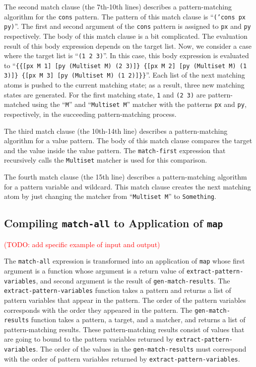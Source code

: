 \documentclass[acmlarge]{acmart}
\newcommand{\todo}[1]{\textcolor{red}{(TODO: #1)}}
\begin{document}
The second match clause (the 7th-10th lines) describes a pattern-matching algorithm for the \texttt{cons} pattern.
The pattern of this match clause is  ``\texttt{('cons px py)}''.
The first and second argument of the \texttt{cons} pattern is assigned to \texttt{px} and \texttt{py} respectively.
The body of this match clause is a bit complicated.
The evaluation result of this body expression depends on the target list.
Now, we consider a case where the target list is ``\texttt{(1 2 3)}''.
In this case, this body expression is evaluated to ``\texttt{\{\{[px M 1] [py (Multiset M) (2 3)]\} \{[px M 2] [py (Multiset M) (1 3)]\} \{[px M 3] [py (Multiset M) (1 2)]\}\}}''.
Each list of the next matching atoms is pushed to the current matching state; as a result, three new matching states are generated.
For the first matching state, \texttt{1} and \texttt{(2 3)} are pattern-matched using the ``\texttt{M}'' and ``\texttt{Multiset M}'' matcher with the patterns \texttt{px} and \texttt{py}, respectively, in the succeeding pattern-matching process.

The third match clause (the 10th-14th line) describes a pattern-matching algorithm for a value pattern.
The body of this match clause compares the target and the value inside the value pattern.
The \texttt{match-first} expression that recursively calls the \texttt{Multiset} matcher is used for this comparison.

The fourth match clause (the 15th line) describes a pattern-matching algorithm for a pattern variable and wildcard.
This match clause creates the next matching atom by just changing the matcher from ``\texttt{Multiset M}'' to \texttt{Something}.

\subsection{Compiling \texttt{match-all} to Application of \texttt{map}}\label{method-map}

\todo{add specific example of input and output}

The \texttt{match-all} expression is transformed into an application of \texttt{map} whose first argument is a function whose argument is a return value of \texttt{extract-pattern-variables}, and second argument is the result of \texttt{gen-match-results}.
The \texttt{extract-pattern-variables} function takes a pattern and returns a list of pattern variables that appear in the pattern.
The order of the pattern variables corresponds with the order they appeared in the pattern.
The \texttt{gen-match-results} function takes a pattern, a target, and a matcher, and returns a list of pattern-matching results.
These pattern-matching results consist of values that are going to bound to the pattern variables returned by \texttt{extract-pattern-variables}.
The order of the values in the \texttt{gen-match-results} must correspond with the order of pattern variables returned by \texttt{extract-pattern-variables}.
\end{document}

